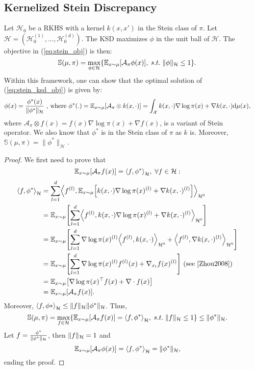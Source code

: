 \documentclass[runningheads,a4paper]{llncs}
\newcommand{\E}{\mathbb{E}}
\newcommand{\Sr}{\mathbb{S}}
\newcommand{\X}{\mathcal{X}}
\newcommand{\A}{\mathcal{A}}
\newcommand{\Hr}{\mathcal{H}}
\newcommand{\dr}{\mathrm{d}}
\DeclarePairedDelimiter{\norm}{\|}{\|}
\DeclarePairedDelimiter{\bra}{\{}{\}}
\DeclarePairedDelimiter{\sq}{[}{]}
\DeclarePairedDelimiter{\sca}{\langle}{\rangle}
\begin{document}
\subsection{Kernelized Stein Discrepancy}\label{sec:ksd}
Let $\Hr_0$ be a RKHS with a kernel $k(x, x')$ in the Stein class of $\pi$.
Let $\Hr = (\Hr^{(1)}_0, \dots, \Hr^{(d)}_0)$. The KSD maximizes $\phi$ in the unit ball of $\Hr$.
The objective in (\ref{eq:stein_obj}) is then:
\begin{equation}
  \Sr(\mu, \pi) =
    \max_{\phi \in \Hr} \bra*{ \E_{x \sim \mu}[\A_\pi \phi (x)], \; s.t. \; \|\phi\|_{\Hr} \leq 1 }.
  \label{eq:stein_ksd_obj}
\end{equation}
Within this framework, one can show that the optimal solution of (\ref{eq:stein_ksd_obj})
is given by:
\begin{equation}
  \phi(x) = \frac{\phi^*(x)}{\|\phi^*\|_{\Hr}}
    \text{ , where } \phi^*(.) = \E_{x \sim \mu}\sq*{ \A_\pi \otimes k(x, \cdot) }
                               = \int_\X k(x, \cdot) \nabla \log \pi(x) + \nabla k(x, \cdot) \dr \mu(x),
  \label{eq:stein_ksd_sol}        
\end{equation}
where $\A_\pi \otimes f(x) = f(x) \nabla \log \pi(x) + \nabla f(x)$, is a variant of Stein operator.
We also know that $\phi^*$ is in the Stein class of $\pi$ as $k$ is.
Moreover, $\Sr(\mu, \pi) = \|\phi^*\|_\Hr$.
\begin{proof}
  We first need to prove that
  $$
  \E_{x \sim \mu} \sq*{ \A_\pi f(x) } = \sca*{f, \phi^*}_\Hr, \; \forall f \in \Hr:
  $$
  \begin{equation}
    \begin{split}
      \sca*{f, \phi^*}_\Hr &= \sum_{l=1}^d \sca*{ f^{(l)},
        \E_{x \sim \mu}\sq*{ k(x, \cdot) \nabla \log \pi(x)^{(l)} + \nabla k(x, \cdot)^{(l)}} }_{\Hr^0} \\
        &= \E_{x \sim \mu}\sq*{ \sum_{l=1}^d \sca*{f^{(l)}, k(x, \cdot)
          \nabla \log \pi(x)^{(l)} + \nabla k(x, \cdot)^{(l)} }_{\Hr^0} } \\
        &= \E_{x \sim \mu}\sq*{ \sum_{l=1}^d \nabla \log \pi(x)^{(l)}
          \sca*{ f^{(l)}, k(x, \cdot) }_{\Hr^0} + \sca*{ f^{(l)}, \nabla k(x, \cdot)^{(l)} }_{\Hr^0} } \\
        &= \E_{x \sim \mu}\sq*{ \sum_{l=1}^d \nabla \log \pi(x)^{(l)} f^{(l)}(x) + \nabla_{x_l} f(x)^{(l)} }
         \text{ (see \cite{Zhou2008}) } \\
        &= \E_{x \sim \mu}\sq*{ \nabla \log \pi(x)^\top f(x) + \nabla \cdot f(x) } \\
        &= \E_{x \sim \mu} \sq*{ \A_\pi f(x) }.
    \end{split}
  \end{equation}
  Moreover, $\sca*{ f, \phi* }_\Hr \leq \norm{f}_\Hr \norm{\phi^*}_\Hr$.
  Thus,
  $$
  \Sr(\mu, \pi) =
    \max_{f \in \Hr} \bra*{ \E_{x \sim \mu}[\A_\pi f (x)] = \sca*{f, \phi^*}_\Hr, \; s.t. \; \|f\|_{\Hr} \leq 1 }
    \leq \norm{\phi^*}_\Hr.
  $$
  Let $f = \frac{\phi^*}{\norm{\phi^*}_\Hr}$, then $\norm{f}_\Hr = 1$ and
  $$
  \E_{x \sim \mu}[\A_\pi \phi (x)] = \sca*{f, \phi^*}_\Hr = \norm{\phi^*}_\Hr,
  $$
  ending the proof.
\end{proof}
\end{document}
